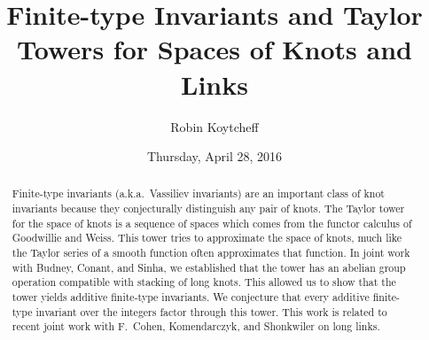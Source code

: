 \documentclass{UAmathtalk}
\author{Robin Koytcheff}
\title{Finite-type Invariants and Taylor Towers for Spaces of Knots and Links}
\date{Thursday, April 28, 2016}
\begin{document}
\maketitle

\begin{abstract}
Finite-type invariants (a.k.a.\ Vassiliev invariants) are an important class of knot invariants because they conjecturally distinguish any pair of knots.  The Taylor tower for the space of knots is a sequence of spaces which comes from the functor calculus of Goodwillie and Weiss. This tower tries to approximate the space of knots, much like the Taylor series of a smooth function often approximates that function.  In joint work with Budney, Conant, and Sinha, we established that the tower has an abelian group operation compatible with stacking of long knots.  This allowed us to show that the tower yields additive finite-type invariants.  We conjecture that every additive finite-type invariant over the integers factor through this tower.  This work is related to recent joint work with F.~Cohen, Komendarczyk, and Shonkwiler on long links.
\end{abstract}
\end{document}

